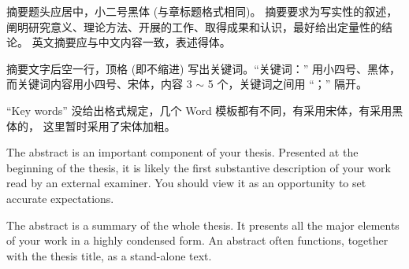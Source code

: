 \begin{cabstract}
    摘要题头应居中，小二号黑体 (与章标题格式相同)。
    摘要要求为写实性的叙述，阐明研究意义、理论方法、开展的工作、取得成果和认识，最好给出定量性的结论。
    英文摘要应与中文内容一致，表述得体。

    摘要文字后空一行，顶格 (即不缩进) 写出关键词。``关键词：'' 用小四号、黑体，
    而关键词内容用小四号、宋体，内容 3 $\sim$ 5 个，关键词之间用  ``；'' 隔开。

    ``Key words'' 没给出格式规定，几个 Word 模板都有不同，有采用宋体，有采用黑体的，
    这里暂时采用了宋体加粗。

\end{cabstract}

\begin{eabstract}
    The abstract is an important component of your thesis. Presented at the
    beginning of the thesis, it is likely the first substantive description of
    your work read by an external examiner. You should view it as an opportunity
    to set accurate expectations.

    The abstract is a summary of the whole thesis. It presents all the major
    elements of your work in a highly condensed form.
    An abstract often functions, together with the thesis title,
    as a stand-alone text.

\end{eabstract}
